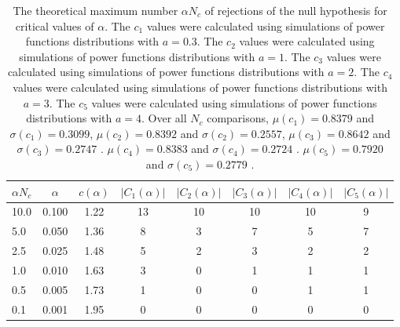 \begin{table}[h!]
\begin{center}
\begin{tabular}{| l | c | c | c | c | c | c | c |}\hline
$\alpha N_c$ & $\alpha$ & $c(\alpha)$ & $|C_1(\alpha)|$ & $|C_2(\alpha)|$ & $|C_3(\alpha)|$ & $|C_4(\alpha)|$ & $|C_5(\alpha)|$ \\\hline\hline
10.0 & 0.100 & 1.22 & 13 & 10 & 10 & 10 & 9 \\\hline
5.0 & 0.050 & 1.36 & 8 & 3 & 7 & 5 & 7 \\\hline
2.5 & 0.025 & 1.48 & 5 & 2 & 3 & 2 & 2 \\\hline
1.0 & 0.010 & 1.63 & 3 & 0 & 1 & 1 & 1 \\\hline
0.5 & 0.005 & 1.73 & 1 & 0 & 0 & 1 & 1 \\\hline
0.1 & 0.001 & 1.95 & 0 & 0 & 0 & 0 & 0 \\\hline
\end{tabular}
\caption{The theoretical maximum number $\alpha N_c$ of rejections
        of the null hypothesis for critical values of $\alpha$.
        The $c_1$ values were calculated using simulations of power functions distributions with $a=0.3$.
        The $c_2$ values were calculated using simulations of power functions distributions with $a=1$.
        The $c_3$ values were calculated using simulations of power functions distributions with $a=2$.
        The $c_4$ values were calculated using simulations of power functions distributions with $a=3$.
        The $c_5$ values were calculated using simulations of power functions distributions with $a=4$.
        Over all $N_c$ comparisons,
         $\mu(c_1)=0.8379$ and $\sigma(c_1)=0.3099$,
         $\mu(c_2)=0.8392$ and $\sigma(c_2)=0.2557$,
         $\mu(c_3)=0.8642$ and $\sigma(c_3)=0.2747$ .
         $\mu(c_4)=0.8383$ and $\sigma(c_4)=0.2724$ .
         $\mu(c_5)=0.7920$ and $\sigma(c_5)=0.2779$ .
        }
\end{center}
\end{table}